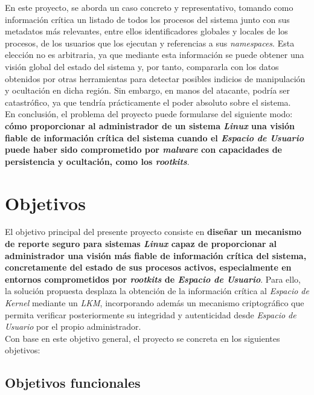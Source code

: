 \newpage

En este proyecto, se aborda un caso concreto y representativo, tomando como información crítica un listado de todos los procesos del sistema junto con sus metadatos más relevantes, entre ellos identificadores globales y locales de los procesos, de los usuarios que los ejecutan y referencias a sus \textit{namespaces}.
Esta elección no es arbitraria, ya que mediante esta información se puede obtener una visión global del estado del sistema y, por tanto, compararla con los datos obtenidos por otras herramientas para detectar posibles indicios de manipulación y ocultación en dicha región.
Sin embargo, en manos del atacante, podría ser catastrófico, ya que tendría prácticamente el poder absoluto sobre el sistema.\\

En conclusión, el problema del proyecto puede formularse del siguiente modo: \textbf{cómo proporcionar al administrador de un sistema \textit{Linux} una visión fiable de información crítica del sistema cuando el \textit{Espacio de Usuario} puede haber sido comprometido por \textit{malware} con capacidades de persistencia y ocultación, como los \textit{rootkits}}.\\

\newpage

\section{Objetivos}

El objetivo principal del presente proyecto consiste en \textbf{diseñar un mecanismo de reporte seguro para sistemas \textit{Linux} capaz de proporcionar al administrador una visión más fiable de información crítica del sistema, concretamente del estado de sus procesos activos, especialmente en entornos comprometidos por \textit{rootkits} de \textit{Espacio de Usuario}}.
Para ello, la solución propuesta desplaza la obtención de la información crítica al \textit{Espacio de Kernel} mediante un \textit{LKM}, incorporando además un mecanismo criptográfico que permita verificar posteriormente su integridad y autenticidad desde \textit{Espacio de Usuario} por el propio administrador.\\

Con base en este objetivo general, el proyecto se concreta en los siguientes objetivos:

\subsection{Objetivos funcionales}
\label{sec:ofunc}

